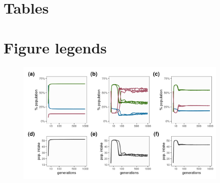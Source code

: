 \documentclass[11pt]{article}
\begin{document}
\newpage{}

\section{Tables}
\renewcommand{\thetable}{\arabic{table}}
\setcounter{table}{0}


\newpage{}

\section{Figure legends}


\begin{figure}[h!]
    \centering
    \includegraphics[width=0.90\textwidth]{figures/fig_02_strategy_generations.png}
    \caption{}
    \label{Fig:EcologicalEquilibrium}
\end{figure}
\end{document}
